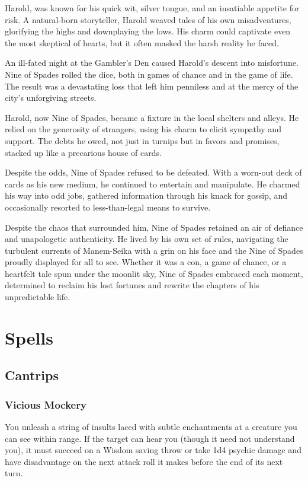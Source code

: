 \documentclass[11pt]{article}
\begin{document}
Harold, was known for his quick wit, silver tongue, and an insatiable appetite for risk. A natural-born storyteller, Harold weaved tales of his own misadventures, glorifying the highs and downplaying the lows. His charm could captivate even the most skeptical of hearts, but it often masked the harsh reality he faced.

An ill-fated night at the Gambler's Den caused Harold's descent into misfortune. Nine of Spades rolled the dice, both in games of chance and in the game of life. The result was a devastating loss that left him penniless and at the mercy of the city's unforgiving streets.

Harold, now Nine of Spades, became a fixture in the local shelters and alleys. He relied on the generosity of strangers, using his charm to elicit sympathy and support. The debts he owed, not just in turnips but in favors and promises, stacked up like a precarious house of cards.

Despite the odds, Nine of Spades refused to be defeated. With a worn-out deck of cards as his new medium, he continued to entertain and manipulate. He charmed his way into odd jobs, gathered information through his knack for gossip, and occasionally resorted to less-than-legal means to survive.

Despite the chaos that surrounded him, Nine of Spades retained an air of defiance and unapologetic authenticity. He lived by his own set of rules, navigating the turbulent currents of Manem-Seika with a grin on his face and the Nine of Spades proudly displayed for all to see. Whether it was a con, a game of chance, or a heartfelt tale spun under the moonlit sky, Nine of Spades embraced each moment, determined to reclaim his lost fortunes and rewrite the chapters of his unpredictable life.
\section{Spells}
\label{sec:org7baaee5}
\subsection{Cantrips}
\label{sec:orge851b0e}
\subsubsection{Vicious Mockery}
\label{sec:org7aa17c8}
You unleash a string of insults laced with subtle enchantments at a creature you can see within range. If the target can hear you (though it need not understand you), it must succeed on a Wisdom saving throw or take 1d4 psychic damage and have disadvantage on the next attack roll it makes before the end of its next turn.
\end{document}
